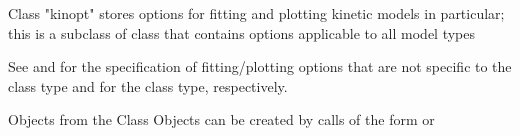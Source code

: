 \begin{Description}\relax
Class "kinopt" stores options for fitting and plotting kinetic
models in particular; this is a subclass of class  that contains 
options applicable to all model types
\end{Description}
\begin{Details}\relax
See  and   for 
the specification of fitting/plotting options that are not specific to the 
class type and for the  class type, respectively.
\end{Details}
\begin{Section}{Objects from the Class}
Objects can be created by calls of the form  or
\end{Section}
